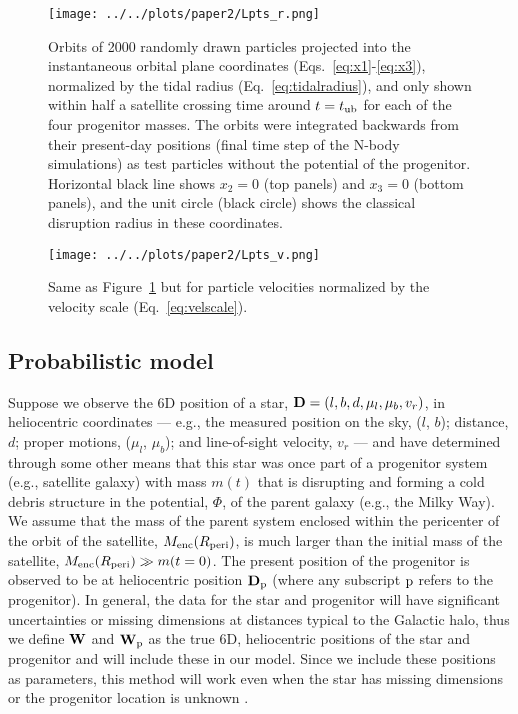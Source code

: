 \documentclass[letterpaper,12pt,preprint]{aastex}
\newcommand{\D}{{\bf D}}
\newcommand{\W}{{\bf W}}
\newcommand{\sat}{{\rm p}}
\newcommand{\tub}{t_{\rm ub}}
\begin{document}
\begin{figure*}[!ht]
\begin{center}
\texttt{[image: ../../plots/paper2/Lpts\_r.png]}
\caption{ Orbits of 2000 randomly drawn particles projected into the instantaneous orbital plane coordinates (Eqs.~\ref{eq:x1}-\ref{eq:x3}), normalized by the tidal radius (Eq.~\ref{eq:tidalradius}), and only shown within half a satellite crossing time around $t=\tub$ for each of the four progenitor masses. The orbits were integrated backwards from their present-day positions (final time step of the N-body simulations) as test particles without the potential of the progenitor. Horizontal black line shows $x_2=0$ (top panels) and $x_3=0$ (bottom panels), and the unit circle (black circle) shows the classical disruption radius in these coordinates. }\label{fig:lpts_r}
\end{center}
\end{figure*}

\begin{figure*}[!ht]
\begin{center}
\texttt{[image: ../../plots/paper2/Lpts\_v.png]}
\caption{ Same as Figure~\ref{fig:lpts_r} but for particle velocities normalized by the velocity scale (Eq.~\ref{eq:velscale}). }\label{fig:lpts_v}
\end{center}
\end{figure*}

\clearpage

\subsection{Probabilistic model}
Suppose we observe the 6D position of a star, $\D = (l,b,d,\mu_l,\mu_b,v_r)$, in heliocentric coordinates --- e.g., the measured position on the sky, ($l$, $b$); distance, $d$; proper motions, ($\mu_l$, $\mu_b$); and line-of-sight velocity, $v_r$ --- and have determined through some other means that this star was once part of a progenitor system (e.g., satellite galaxy) with mass $m(t)$ that is disrupting and forming a cold debris structure in the potential, $\Phi$, of the parent galaxy (e.g., the Milky Way). We assume that the mass of the parent system enclosed within the pericenter of the orbit of the satellite, $M_{\rm enc}(R_{\rm peri})$, is much larger than the initial mass of the satellite, $M_{\rm enc}(R_{\rm peri})\gg m(t=0)$. The present position of the progenitor is observed to be at heliocentric position $\D_\sat$ (where any subscript $\sat$ refers to the progenitor). In general, the data for the star and progenitor will have significant uncertainties or missing dimensions at distances typical to the Galactic halo, thus we define $\W$ and $\W_\sat$ as the true 6D, heliocentric positions of the star and progenitor and will include these in our model. Since we include these positions as parameters, this method will work even when the star has missing dimensions or the progenitor location is unknown \citep[as in the Orphan stream,][]{belokurov07}.
\end{document}
